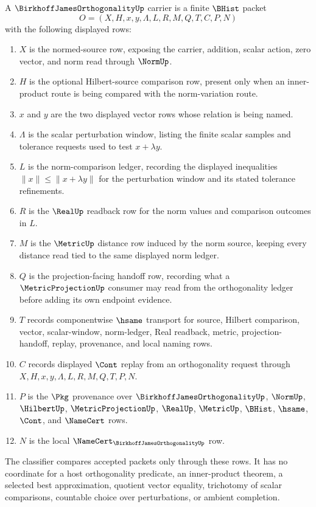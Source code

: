 \begin{definition}
\label{def:birkhoff-james-orthogonality-carrier}
A $\BirkhoffJamesOrthogonalityUp$ carrier is a finite $\BHist$ packet
$$
O=(X,H,x,y,\Lambda,L,R,M,Q,T,C,P,N)
$$
with the following displayed rows:
\begin{enumerate}
\item $X$ is the normed-source row, exposing the carrier, addition, scalar action, zero vector, and norm read through $\NormUp$.
\item $H$ is the optional Hilbert-source comparison row, present only when an inner-product route is being compared with the norm-variation route.
\item $x$ and $y$ are the two displayed vector rows whose relation is being named.
\item $\Lambda$ is the scalar perturbation window, listing the finite scalar samples and tolerance requests used to test $x+\lambda y$.
\item $L$ is the norm-comparison ledger, recording the displayed inequalities $\|x\|\leq \|x+\lambda y\|$ for the perturbation window and its stated tolerance refinements.
\item $R$ is the $\RealUp$ readback row for the norm values and comparison outcomes in $L$.
\item $M$ is the $\MetricUp$ distance row induced by the norm source, keeping every distance read tied to the same displayed norm ledger.
\item $Q$ is the projection-facing handoff row, recording what a $\MetricProjectionUp$ consumer may read from the orthogonality ledger before adding its own endpoint evidence.
\item $T$ records componentwise $\hsame$ transport for source, Hilbert comparison, vector, scalar-window, norm-ledger, Real readback, metric, projection-handoff, replay, provenance, and local naming rows.
\item $C$ records displayed $\Cont$ replay from an orthogonality request through $X,H,x,y,\Lambda,L,R,M,Q,T,P,N$.
\item $P$ is the $\Pkg$ provenance over $\BirkhoffJamesOrthogonalityUp$, $\NormUp$, $\HilbertUp$, $\MetricProjectionUp$, $\RealUp$, $\MetricUp$, $\BHist$, $\hsame$, $\Cont$, and $\NameCert$ rows.
\item $N$ is the local $\NameCert_{\BirkhoffJamesOrthogonalityUp}$ row.
\end{enumerate}
The classifier compares accepted packets only through these rows. It has no coordinate for a host orthogonality predicate, an inner-product theorem, a selected best approximation, quotient vector equality, trichotomy of scalar comparisons, countable choice over perturbations, or ambient completion.
\end{definition}

